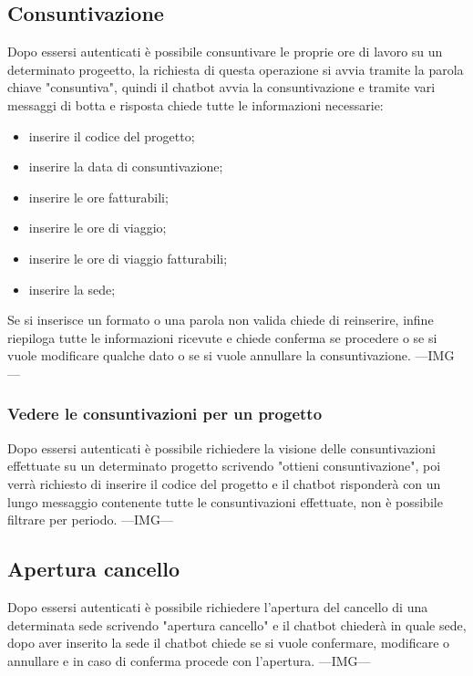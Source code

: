 \subsection{Consuntivazione}
Dopo essersi autenticati è possibile consuntivare le proprie ore di lavoro su un determinato progeetto, la richiesta di questa operazione si avvia tramite la parola chiave "consuntiva", quindi il chatbot avvia la consuntivazione e tramite vari messaggi di botta e risposta chiede tutte le informazioni necessarie:
\begin{itemize}
    \item inserire il codice del progetto;
    \item inserire la data di consuntivazione;
    \item inserire le ore fatturabili;
    \item inserire le ore di viaggio;
    \item inserire le ore di viaggio fatturabili;
    \item inserire la sede;
\end{itemize}
Se si inserisce un formato o una parola non valida chiede di reinserire, infine riepiloga tutte le informazioni ricevute e chiede conferma se procedere o se si vuole modificare qualche dato o se si vuole annullare la consuntivazione. ---IMG---
\subsubsection{Vedere le consuntivazioni per un progetto}
Dopo essersi autenticati è possibile richiedere la visione delle consuntivazioni effettuate su un determinato progetto scrivendo "ottieni consuntivazione", poi verrà richiesto di inserire il codice del progetto e il chatbot risponderà con un lungo messaggio contenente tutte le consuntivazioni effettuate, non è possibile filtrare per periodo. ---IMG---
\subsection{Apertura cancello}
Dopo essersi autenticati è possibile richiedere l'apertura del cancello di una determinata sede scrivendo "apertura cancello" e il chatbot chiederà in quale sede, dopo aver inserito la sede il chatbot chiede se si vuole confermare, modificare o annullare e in caso di conferma procede con l'apertura. ---IMG--- 
\newpage